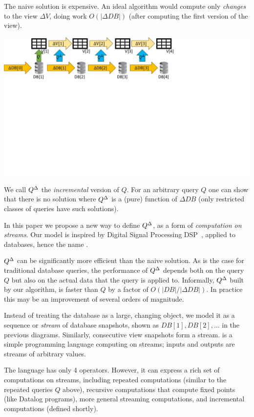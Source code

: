 The naive solution is expensive.  An ideal algorithm would compute
only \emph{changes} to the view $\Delta V$, doing work $O(|\Delta DB|)$
(after computing the first version of the view).

\noindent \includegraphics[trim={0 5.2in 4.1in 0},clip,scale=.35]{incview.pdf}

We call ${Q}^{\Delta}$ the \emph{incremental} version of $Q$.  For an
arbitrary query $Q$ one can show that there is no solution where
${Q}^{\Delta}$ is a (pure) function of $\Delta DB$ (only restricted classes
of queries have such solutions).

In this paper we propose a new way to define ${Q}^{\Delta}$, as a form of
\emph{computation on streams}.  Our model is inspired by Digital
Signal Processing DSP~\cite{rabiner-book75}, applied to databases,
hence the name \dbsp.

${Q}^{\Delta}$ can be significantly more efficient than the naive
solution.  As is the case for traditional database queries, the
performance of ${Q}^{\Delta}$ depends both on the query $Q$ but also on the
actual data that the query is applied to.  Informally, ${Q}^{\Delta}$ built
by our algorithm, is faster than $Q$ by a factor of $O(|DB| / |\Delta
DB|)$.  In practice this may be an improvement of several orders of
magnitude.

Instead of treating the database as a large, changing object, we model
it as a sequence or \emph{stream} of database snapshots, shown as
$DB[1], DB[2], \ldots$ in the previous diagrams.  Similarly,
consecutive view snapshots form a stream.  \dbsp is a simple
programming language computing on streams; inputs and outputs are
streams of arbitrary values.

The \dbsp language has only 4 operators.  However, it can express a
rich set of computations on streams, including repeated computations
(similar to the repeated queries $Q$ above), recursive computations
that compute fixed points (like Datalog programs), more general
streaming computations, and incremental computations (defined
shortly).

